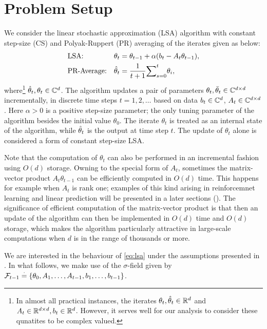 \section{Problem Setup}
We consider the linear stochastic approximation (LSA) algorithm with constant step-size (CS) and Polyak-Ruppert (PR) averaging of the iterates given as below:
\begin{subequations}\label{eq:lsa}
\begin{align}
\label{conststep}&\text{LSA:} &\theta_t&=\theta_{t-1}+\alpha(b_t-A_t\theta_{t-1}),\\
\label{iteravg}&\text{PR-Average:} &\hat{\theta}_t&=\frac{1}{t+1}{\sum}_{s=0}^{t}\theta_i,
\end{align}
\end{subequations}
where\footnote{In almost all practical instances, the iterates $\theta_t,\hat{\theta}_t\in \mathbb{R}^d$ and $A_t\in \mathbb{R}^{d \times d}, b_t\in \mathbb{R}^d$. However, it serves well for our analysis to consider these qunatites to be complex valued.} $\hat{\theta}_t, \theta_t \in \mathbb{C}^{d}$. The algorithm updates a pair of parameters $\theta_t,\bar{\theta}_t\in \mathbb{C}^{d \times d}$ incrementally, in discrete time steps $t=1,2,\dots$
based on data $b_t\in \mathbb{C}^d$, $A_t\in \mathbb{C}^{d \times d}$. Here $\alpha>0$ is a positive step-size parameter; the only tuning parameter of the algorithm besides the
initial value $\theta_0$. The iterate $\theta_t$ is treated as an internal state of the algorithm, while $\hat{\theta}_t$ is the output at time step $t$. The update of $\theta_t$ alone is considered a form of constant step-size LSA.\par
Note that the computation of $\theta_t$ can also be performed in an incremental fashion using $O(d)$ storage. Owning to the special form of $A_t$, sometimes the matrix-vector product $A_t \theta_{t-1}$ can be efficiently computed in $O(d)$ time. This happens for example when $A_t$ is rank one; examples of this kind arising in reinforcemnet learning \cite{sutton,konda-tsitsiklis,gtd,gtd2,gtdmp} and linear prediction \cite{bach,bachaistats} will be presented in a later sections (). The significance of efficient computation of the matrix-vector product is that then an update of the algorithm
can then be implemented in $O(d)$ time and $O(d)$ storage, which makes the algorithm particularly attractive in large-scale computations when $d$ is in the range of thousands or more.\par
We are interested in the behaviour of \eqref{eq:lsa} under the assumptions presented in . In what follows, we make use of the $\sigma$-field given by $\mathcal{F}_{t-1}\stackrel{\cdot}{=}\{\theta_0,A_1,\ldots, A_{t-1}, b_1,\ldots, b_{t-1}\}$.
